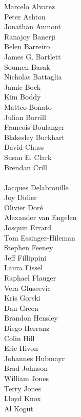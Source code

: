 \documentclass[PICOReport.tex]{subfiles}
\begin{document}
\footnotesize {

\begin{multicols}{4}
Marcelo Alvarez \\
Peter Ashton    \\
Jonathan Aumont \\
Ranajoy Banerji \\
Belen Barreiro  \\
James G. Bartlett  \\
Soumen Basak    \\
Nicholas Battaglia    \\
Jamie Bock    \\
Kim Boddy    \\
Matteo Bonato    \\
Julian Borrill    \\
Francois Boulanger    \\
Blakesley Burkhart    \\
David Chuss    \\
Susan E. Clark    \\
Brendan Crill    \\    \\
Jacques Delabrouille    \\
Joy Didier    \\
Olivier Dor\'e    \\
Alexander van Engelen    \\
Josquin Errard    \\
Tom Essinger-Hileman    \\
Stephen Feeney    \\
Jeff Fillippini    \\
Laura Fissel    \\
Raphael Flauger    \\
Vera Gluscevic    \\
Kris Gorski    \\
Dan Green    \\
Brandon Hensley    \\
Diego Herranz    \\
Colin Hill    \\
Eric Hivon    \\
Johannes Hubmayr    \\
Brad Johnson    \\
William Jones    \\
Terry Jones    \\
Lloyd Knox    \\
Al Kogut    \\

\end{multicols}}
\end{document}
